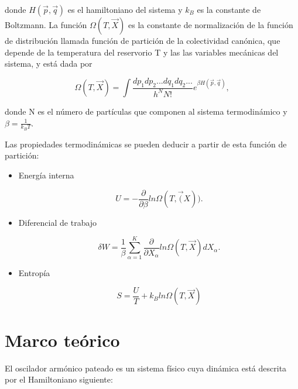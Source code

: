 \documentclass[letterpaper,12pt,oneside]{book}
\begin{document}
	\noindent donde $H(\vec{p}, \vec{q})$ es el hamiltoniano del sistema y  $k_B$ es la constante de Boltzmann. La funci\'on $\Omega(T, \vec{X})$ es la constante de normalizaci\'on de la funci\'on de distribuci\'on llamada funci\'on de partici\'on de la colectividad can\'onica, que depende de la temperatura del reservorio T y las las variables mec\'anicas del sistema, y est\'a dada por
	
	\begin{equation}
		\Omega(T, \vec{X}) = \int \frac{dp_1 dp_2 ... dq_1 dq_2...}{h^NN!} e^{\beta H(\vec{p}, \vec{q})}, 
	\end{equation}
	
	\noindent donde N es el n\'umero de part\'iculas que componen al sistema termodin\'amico y $\beta = \frac{1}{k_BT}$.
	
	Las propiedades termodin\'amicas se pueden deducir a partir de esta funci\'on de partici\'on:
	
	\begin{itemize}
		\item Energ\'ia interna
		
		\begin{equation}
			U = -\frac{\partial}{\partial \beta} ln\Omega(T, \vec(X)).
		\end{equation}
		
		\item Diferencial de trabajo
		
		\begin{equation}
			\delta W = \frac{1}{\beta}\sum_{\alpha=1}^K\frac{\partial}{\partial X_{\alpha}}ln\Omega(T, \vec{X})dX_\alpha.
		\end{equation}
		
		\item Entrop\'ia
		
		\begin{equation}
			S = \frac{U}{T} + k_Bln\Omega(T, \vec{X})
		\end{equation}
	\end{itemize}	
	
	
	\chapter{Marco te\'orico}
	
	El oscilador arm\'onico pateado es un sistema f\'isico cuya din\'amica est\'a descrita por el Hamiltoniano siguiente:
	
\end{document}
